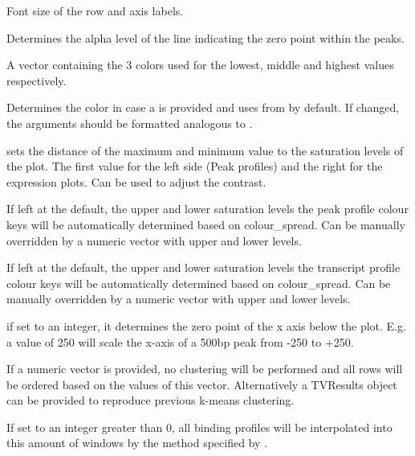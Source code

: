 \documentclass[letterpaper]{book}
\begin{document}
\begin{Arguments}
\begin{ldescription}
\item[\code{label\_size}] 
Font size of the row and axis labels.

\item[\code{zero\_alpha}] 
Determines the alpha level of the line indicating the zero point within the peaks.

\item[\code{colr}] 
A vector containing the 3 colors used for the lowest, middle and highest values respectively.  

\item[\code{colr\_df}] 
Determines the color in case a  is provided and uses  from  by default. If changed, the arguments should be formatted analogous to .   

\item[\code{colour\_spread}] 
sets the distance of the maximum and minimum value to the saturation levels of the plot. The first value for the left side (Peak profiles) and the right for the expression plots. Can be used to adjust the contrast.

\item[\code{key\_limit}] 
If left at the default, the upper and lower saturation levels the peak profile colour keys will be automatically determined based on colour\_spread. Can be manually overridden by a numeric vector with upper and lower levels.

\item[\code{key\_limit\_rna}] 
If left at the default, the upper and lower saturation levels the transcript profile colour keys will be automatically determined based on colour\_spread. Can be manually overridden by a numeric vector with upper and lower levels.

\item[\code{set\_zero}] 
if set to an integer, it determines the zero point of the x axis below the plot. E.g. a value of 250 will scale the x-axis of a 500bp peak from -250 to +250.

\item[\code{rowv}] 
If a numeric vector is provided, no clustering will be performed and all rows will be ordered based on the values of this vector. Alternatively a TVResults object can be provided to reproduce previous k-means clustering. 
 
\item[\code{peak\_windows}] 
If set to an integer greater than 0, all binding profiles will be interpolated into this amount of windows by the method specified by .


\end{ldescription}
\end{Arguments}
\end{document}
